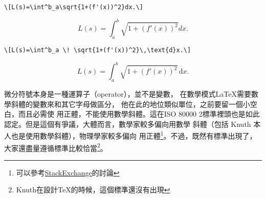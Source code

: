 
\begin{Wrong}
\begin{verbatim}
\[L(s)=\int^b_a\sqrt{1+(f'(x))^2}dx.\]
\end{verbatim}
\[L(s)=\int^b_a\sqrt{1+(f'(x))^2}dx.\]
\end{Wrong}

\begin{Right}
\begin{verbatim}
\[L(s)=\int^b_a \! \sqrt{1+(f'(x))^2}\,\text{d}x.\]
\end{verbatim}
\[L(s)=\int^b_a \! \sqrt{1+(f'(x))^2} \, \text{d}x.\]
\end{Right}

微分符號本身是一種運算子（operator），並不是變數，
在數學模式\LaTeX 需要數學斜體的變數來和其它字母做區分，
他在此的地位類似單位，之前要留一個小空白，而且必需使
用正體，不能使用數學斜體。這在ISO 80000 2標準裡頭也是如此
認定。但是這個有爭議，大體而言，數學家較多偏向用數學
斜體（包括 Knuth 本人也是使用數學斜體），物理學家較多偏向
用正體\footnote{可以參考\href{https://tex.stackexchange.com/questions/14821/whats-the-proper-way-to-typeset-a-differential-operator}{\sf StackExchange}的討論}。不過，既然有標準出現了，大家還盡量遵循標準比較恰當\footnote{Knuth在設計\TeX 的時候，這個標準還沒有出現}。

\marginpar{\back}
